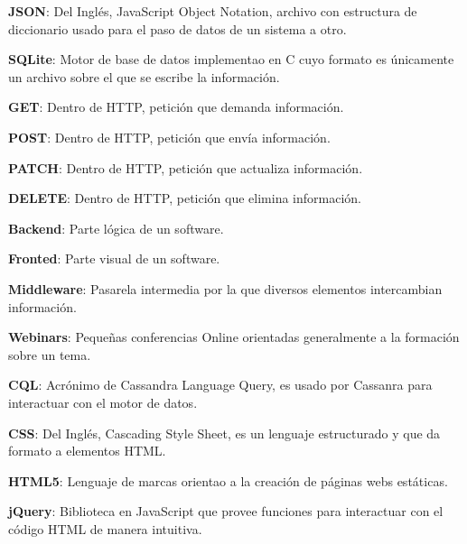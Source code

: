 \textbf{JSON}: Del Inglés, JavaScript Object Notation, archivo con estructura de diccionario usado para el paso de datos de un sistema a otro.
\bigskip

\textbf{SQLite}: Motor de base de datos implementao en C cuyo formato es únicamente un archivo sobre el que se escribe la información.
\bigskip

\textbf{GET}: Dentro de HTTP, petición que demanda información.
\bigskip

\textbf{POST}: Dentro de HTTP, petición que envía información.
\bigskip

\textbf{PATCH}: Dentro de HTTP, petición que actualiza información.
\bigskip

\textbf{DELETE}: Dentro de HTTP, petición que elimina información.
\bigskip

\textbf{Backend}: Parte lógica de un software.
\bigskip

\textbf{Fronted}: Parte visual de un software.
\bigskip

\textbf{Middleware}: Pasarela intermedia por la que diversos elementos intercambian información.
\bigskip

\textbf{Webinars}: Pequeñas conferencias Online orientadas generalmente a la formación sobre un tema.
\bigskip


\textbf{CQL}: Acrónimo de Cassandra Language Query, es usado por Cassanra para interactuar con el motor de datos.
\bigskip

\textbf{CSS}: Del Inglés, Cascading Style Sheet, es un lenguaje estructurado y que da formato a elementos HTML.
\bigskip

\textbf{HTML5}: Lenguaje de marcas orientao a la creación de páginas webs estáticas.
\bigskip

\textbf{jQuery}: Biblioteca en JavaScript que provee funciones para interactuar con el código HTML de manera intuitiva.
\bigskip
